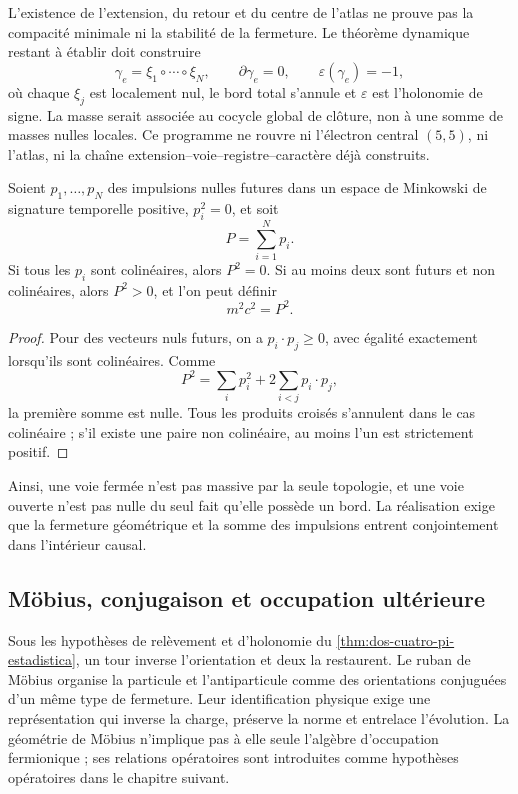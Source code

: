 L'existence de l'extension, du retour et du centre de l'atlas ne prouve pas
la compacité minimale ni la stabilité de la fermeture. Le théorème dynamique
restant à établir doit construire
\[
 \gamma_e=\xi_1\circ\cdots\circ\xi_N,
 \qquad
 \partial\gamma_e=0,
 \qquad
 \varepsilon(\gamma_e)=-1,
\]
où chaque \(\xi_j\) est localement nul, le bord total s'annule et
\(\varepsilon\) est l'holonomie de signe. La masse serait associée au cocycle
global de clôture, non à une somme de masses nulles locales. Ce programme ne
rouvre ni l'électron central \((5,5)\), ni l'atlas, ni la chaîne
extension--voie--registre--caractère déjà construits.

\begin{proposition}
\label{prop:cierre-nulos-interior-causal}
Soient \(p_1,\ldots,p_N\) des impulsions nulles futures dans un espace de Minkowski de
signature temporelle positive, \(p_i^2=0\), et soit
\[
 P=\sum_{i=1}^{N}p_i.
\]
Si tous les \(p_i\) sont colinéaires, alors \(P^2=0\). Si au moins deux sont
futurs et non colinéaires, alors \(P^2>0\), et l'on peut définir
\[
 m^2c^2=P^2.
\]
\end{proposition}

\begin{proof}
Pour des vecteurs nuls futurs, on a
\(p_i\cdot p_j\geq0\), avec égalité exactement lorsqu'ils sont colinéaires.
Comme
\[
 P^2=\sum_i p_i^2+2\sum_{i<j}p_i\cdot p_j,
\]
la première somme est nulle. Tous les produits croisés s'annulent dans le cas
colinéaire ; s'il existe une paire non colinéaire, au moins l'un est strictement
positif.
\end{proof}

Ainsi, une voie fermée n'est pas massive par la seule topologie, et une voie
ouverte n'est pas nulle du seul fait qu'elle possède un bord. La réalisation exige que
la fermeture géométrique et la somme des impulsions entrent conjointement dans
l'intérieur causal.

\subsection{Möbius, conjugaison et occupation ultérieure}

Sous les hypothèses de relèvement et d'holonomie du
\cref{thm:dos-cuatro-pi-estadistica}, un tour inverse l'orientation et
deux la restaurent. Le ruban de Möbius organise la particule et l'antiparticule comme des
orientations conjuguées d'un même type de fermeture. Leur identification physique
exige une représentation qui inverse la charge, préserve la norme et
entrelace l'évolution. La géométrie de Möbius n'implique pas à elle seule
l'algèbre d'occupation fermionique ; ses relations opératoires sont
introduites comme hypothèses opératoires dans le chapitre suivant.

